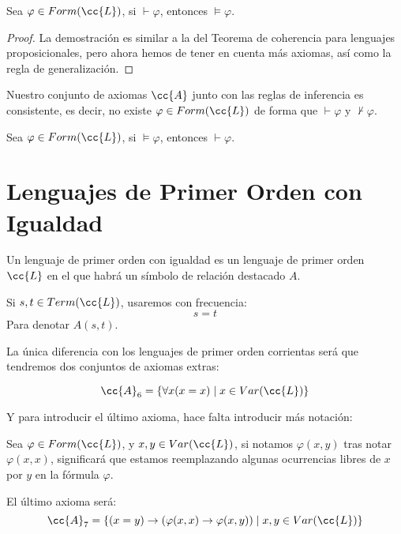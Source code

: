 \begin{teo}[de coherencia]
    Sea $\varphi \in Form(\cc{L})$, si $\vdash \varphi$, entonces $\vDash \varphi$.
    \begin{proof}
        La demostración es similar a la del Teorema de coherencia para lenguajes proposicionales, pero ahora hemos de tener en cuenta más axiomas, así como la regla de generalización.
    \end{proof}
\end{teo}

\begin{teo}[de consistencia]
    Nuestro conjunto de axiomas $\cc{A}$ junto con las reglas de inferencia es consistente, es decir, no existe $\varphi \in Form(\cc{L})$ de forma que $\vdash \varphi$ y $\nvdash\varphi$.
\end{teo}

\begin{teo}[de adecuación]
    Sea $\varphi \in Form(\cc{L})$, si $\vDash\varphi$, entonces $\vdash \varphi$.
\end{teo}

\section{Lenguajes de Primer Orden con Igualdad}
Un lenguaje de primer orden con igualdad es un lenguaje de primer orden $\cc{L}$ en el que habrá un símbolo de relación destacado $A$.

\begin{notacion}
    Si $s,t\in Term(\cc{L})$, usaremos con frecuencia:
    \begin{equation*}
        s = t
    \end{equation*}
    Para denotar $A(s,t)$.
\end{notacion}

La única diferencia con los lenguajes de primer orden corrientas será que tendremos dos conjuntos de axiomas extras:

\begin{equation*}
    \cc{A}_6 = \{\forall x(x=x) \mid x\in Var(\cc{L})\}
\end{equation*}

Y para introducir el último axioma, hace falta introducir más notación:
\begin{notacion}
    Sea $\varphi \in Form(\cc{L})$, y $x,y\in Var(\cc{L})$, si notamos $\varphi(x,y)$ tras notar $\varphi(x,x)$, significará que estamos reemplazando algunas ocurrencias libres de $x$ por $y$ en la fórmula $\varphi$.
\end{notacion}
El último axioma será:
\begin{equation*}
    \cc{A}_7 = \{(x=y)\to (\varphi(x,x)\to \varphi(x,y))\mid x,y\in Var(\cc{L})\}
\end{equation*}

